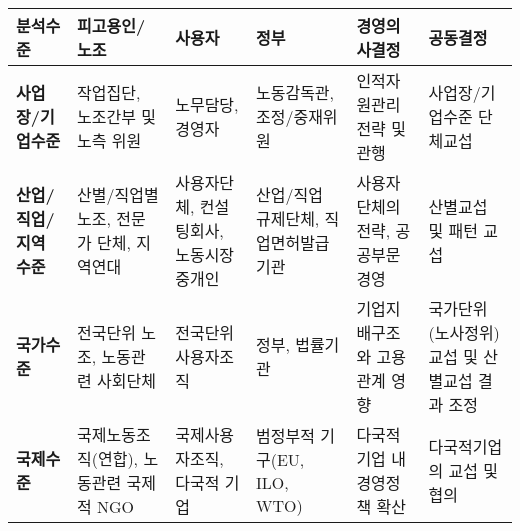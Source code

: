 \centering
\begin{tabular}{|>{\centering\arraybackslash}m{2cm}|>{\centering\arraybackslash}m{2.2cm}|>{\centering\arraybackslash}m{2.2cm}|>{\centering\arraybackslash}m{2.2cm}|>{\centering\arraybackslash}m{2.2cm}|>{\centering\arraybackslash}m{2.2cm}|}
\hline
\textbf{분석수준} & \textbf{피고용인/노조} & \textbf{사용자} & \textbf{정부} & \textbf{경영의사결정} & \textbf{공동결정} \\
\hline
\textbf{사업장/기업수준} & 작업집단, 노조간부 및 노측 위원 & 노무담당, 경영자 & 노동감독관, 조정/중재위원 & 인적자원관리 전략 및 관행 & 사업장/기업수준 단체교섭 \\
\hline
\textbf{산업/직업/지역 수준} & 산별/직업별노조, 전문가 단체, 지역연대 & 사용자단체, 컨설팅회사, 노동시장 중개인 & 산업/직업 규제단체, 직업면허발급기관 & 사용자단체의 전략, 공공부문 경영 & 산별교섭 및 패턴 교섭 \\
\hline
\textbf{국가수준} & 전국단위 노조, 노동관련 사회단체 & 전국단위 사용자조직 & 정부, 법률기관 & 기업지배구조와 고용관계 영향 & 국가단위(노사정위) 교섭 및 산별교섭 결과 조정 \\
\hline
\textbf{국제수준} & 국제노동조직(연합), 노동관련 국제적 NGO & 국제사용자조직, 다국적 기업 & 범정부적 기구(EU, ILO, WTO) & 다국적기업 내 경영정책 확산 & 다국적기업의 교섭 및 협의 \\
\hline
\end{tabular}